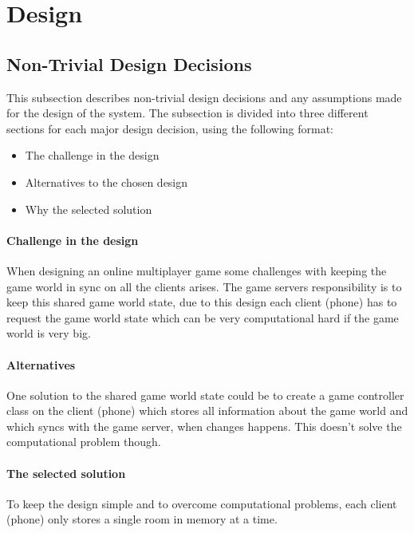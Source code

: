 \chapter{Design}
\section{Non-Trivial Design Decisions}

This subsection describes non-trivial design decisions and any assumptions made for the design of the system. The subsection is divided into three different sections for each major design decision, using the following format:

\begin{itemize}
    \item The challenge in the design
    \item Alternatives to the chosen design
    \item Why the selected solution
\end{itemize}

\subsubsection*{Challenge in the design}
When designing an online multiplayer game some challenges with keeping the game world in sync on all the clients arises. The game servers responsibility is to keep this shared game world state, due to this design each client (phone) has to request the game world state which can be very computational hard if the game world is very big. 

\subsubsection*{Alternatives}
One solution to the shared game world state could be to create a game controller class on the client (phone) which stores all information about the game world and which syncs with the game server, when changes happens. This doesn't solve the computational problem though.

\subsubsection*{The selected solution}
To keep the design simple and to overcome computational problems, each client (phone) only stores a single room in memory at a time.